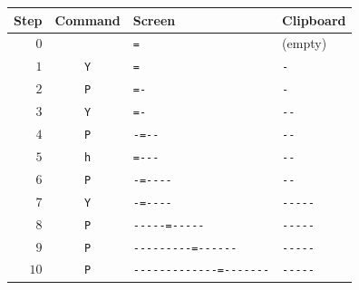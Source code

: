 \noindent
\begin{tabular}{| r | c | l | l |}
  \hline
  \textbf{Step} & \textbf{Command} & \textbf{Screen} & \textbf{Clipboard} \\ \hline
  $0$  &            & \verb|=|                     & (empty)      \\ \hline
  $1$  & \texttt{Y} & \verb|=|                     & \verb|-|     \\ \hline
  $2$  & \texttt{P} & \verb|=-|                    & \verb|-|     \\ \hline
  $3$  & \texttt{Y} & \verb|=-|                    & \verb|--|    \\ \hline
  $4$  & \texttt{P} & \verb|-=--|                  & \verb|--|    \\ \hline
  $5$  & \texttt{h} & \verb|=---|                  & \verb|--|    \\ \hline
  $6$  & \texttt{P} & \verb|-=----|                & \verb|--|    \\ \hline
  $7$  & \texttt{Y} & \verb|-=----|                & \verb|-----| \\ \hline
  $8$  & \texttt{P} & \verb|-----=-----|           & \verb|-----| \\ \hline
  $9$  & \texttt{P} & \verb|---------=------|      & \verb|-----| \\ \hline
  $10$ & \texttt{P} & \verb|-------------=-------| & \verb|-----| \\ \hline
\end{tabular}
